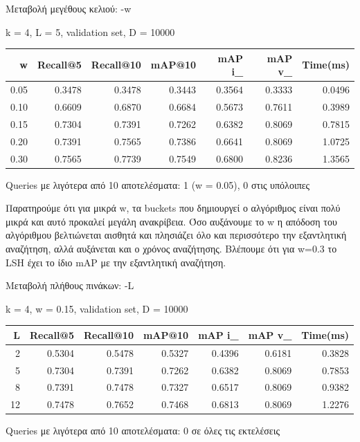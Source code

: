 \documentclass [conference]{IEEEtran}
\begin{document}
Μεταβολή μεγέθους κελιού: -w
\begin{table}[H]
    \centering
    \footnotesize
    \setlength{\tabcolsep}{3pt}
    k = 4, L = 5, validation set, D = 10000
    \par\smallskip
    \begin{tabular}{r r r r r r r}
    \hline
    \textbf{w} & \textbf{Recall@5} & \textbf{Recall@10} & \textbf{mAP@10} & \textbf{mAP i\_} & \textbf{mAP v\_} & \textbf{Time(ms)} \\
    \hline
    0.05 & 0.3478 & 0.3478 & 0.3443 & 0.3564 & 0.3333 & 0.0496 \\
    0.10 & 0.6609 & 0.6870 & 0.6684 & 0.5673 & 0.7611 & 0.3989 \\
    0.15 & 0.7304 & 0.7391 & 0.7262 & 0.6382 & 0.8069 & 0.7815 \\
    0.20 & 0.7391 & 0.7565 & 0.7386 & 0.6641 & 0.8069 & 1.0725 \\
    0.30 & 0.7565 & 0.7739 & 0.7549 & 0.6800 & 0.8236 & 1.3565 \\
    \hline
    \end{tabular}
    \par\smallskip
    \footnotesize Queries με λιγότερα από 10 αποτελέσματα: 1 (w = 0.05), 0 στις υπόλοιπες
\end{table}

Παρατηρούμε ότι για μικρά w, τα buckets που δημιουργεί ο αλγόριθμος είναι πολύ μικρά και αυτό προκαλεί μεγάλη ανακρίβεια. Όσο αυξάνουμε το w η απόδοση του αλγόριθμου βελτιώνεται αισθητά και πλησιάζει όλο και περισσότερο την εξαντλητική αναζήτηση, αλλά αυξάνεται και ο χρόνος αναζήτησης. Βλέπουμε ότι για w=0.3 το LSH έχει το ίδιο mAP με την εξαντλητική αναζήτηση.

Μεταβολή πλήθους πινάκων: -L
\begin{table}[H]
    \centering
    \footnotesize
    \setlength{\tabcolsep}{3pt}
    k = 4, w = 0.15, validation set, D = 10000
    \par\smallskip
    \begin{tabular}{r r r r r r r}
    \hline
    \textbf{L} & \textbf{Recall@5} & \textbf{Recall@10} & \textbf{mAP@10} & \textbf{mAP i\_} & \textbf{mAP v\_} & \textbf{Time(ms)} \\
    \hline
    2  & 0.5304 & 0.5478 & 0.5327 & 0.4396 & 0.6181 & 0.3828 \\
    5  & 0.7304 & 0.7391 & 0.7262 & 0.6382 & 0.8069 & 0.7853 \\
    8  & 0.7391 & 0.7478 & 0.7327 & 0.6517 & 0.8069 & 0.9382 \\
    12 & 0.7478 & 0.7652 & 0.7468 & 0.6813 & 0.8069 & 1.2276 \\
    \hline
    \end{tabular}
    \par\smallskip
    \footnotesize Queries με λιγότερα από 10 αποτελέσματα: 0 σε όλες τις εκτελέσεις
\end{table}
\end{document}
